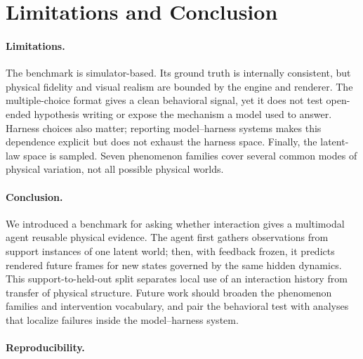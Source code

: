 \section{Limitations and Conclusion}
\label{sec:conclusion}

\paragraph{Limitations.} The benchmark is simulator-based. Its ground truth is internally consistent, but physical fidelity and visual realism are bounded by the engine and renderer. The multiple-choice format gives a clean behavioral signal, yet it does not test open-ended hypothesis writing or expose the mechanism a model used to answer. Harness choices also matter; reporting model--harness systems makes this dependence explicit but does not exhaust the harness space. Finally, the latent-law space is sampled. Seven phenomenon families cover several common modes of physical variation, not all possible physical worlds. 

\paragraph{Conclusion.} We introduced a benchmark for asking whether interaction gives a multimodal agent reusable physical evidence. The agent first gathers observations from support instances of one latent world; then, with feedback frozen, it predicts rendered future frames for new states governed by the same hidden dynamics. This support-to-held-out split separates local use of an interaction history from transfer of physical structure.  Future work should broaden the phenomenon families and intervention vocabulary, and pair the behavioral test with analyses that localize failures inside the model--harness system.

\paragraph{Reproducibility.} 
